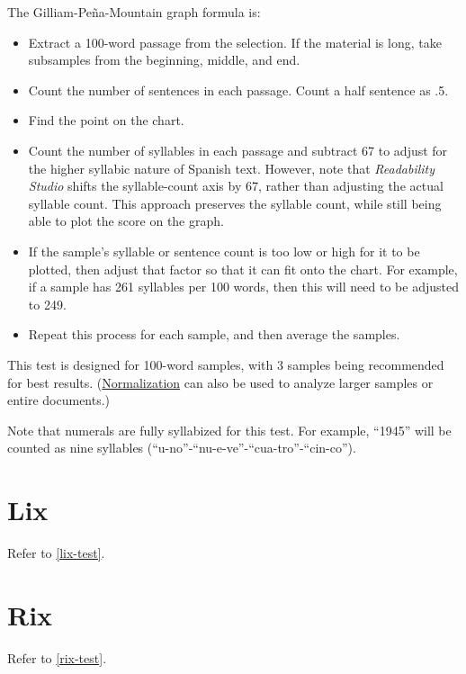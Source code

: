 \documentclass[
]{book}
\providecommand{\tightlist}{%
  \setlength{\itemsep}{0pt}\setlength{\parskip}{0pt}}
\theoremstyle{definition}
\theoremstyle{definition}
\theoremstyle{definition}
\theoremstyle{definition}
\theoremstyle{remark}
\begin{document}
The Gilliam-Peña-Mountain graph formula is:

\begin{itemize}
\tightlist
\item
  Extract a 100-word passage from the selection. If the material is long, take subsamples from the beginning, middle, and end.
\item
  Count the number of sentences in each passage. Count a half sentence as .5.
\item
  Find the point on the chart.
\item
  Count the number of syllables in each passage and subtract 67 to adjust for the higher syllabic nature of Spanish text. However, note that \emph{Readability Studio} shifts the syllable-count axis by 67, rather than adjusting the actual syllable count. This approach preserves the syllable count, while still being able to plot the score on the graph.
\item
  If the sample's syllable or sentence count is too low or high for it to be plotted, then adjust that factor so that it can fit onto the chart. For example, if a sample has 261 syllables per 100 words, then this will need to be adjusted to 249.
\item
  Repeat this process for each sample, and then average the samples.
\end{itemize}

This test is designed for 100-word samples, with 3 samples being recommended for best results. (\protect\hyperlink{glossary}{Normalization} can also be used to analyze larger samples or entire documents.)

Note that numerals are fully syllabized for this test. For example, ``1945'' will be counted as nine syllables (``u-no''-``nu-e-ve''-``cua-tro''-``cin-co'').

\newpage

\hypertarget{lix-spanish}{%
\section{Lix}\label{lix-spanish}}

Refer to \ref{lix-test}.

\hypertarget{rix-spanish}{%
\section{Rix}\label{rix-spanish}}

Refer to \ref{rix-test}.
\end{document}
